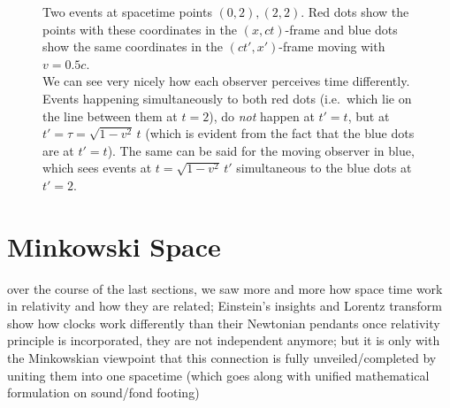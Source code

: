 \begin{figure}
\centering


\caption{Two events at spacetime points $(0,2), (2,2)$. Red dots show the points with these coordinates in the $(x, ct)$-frame and blue dots show the same coordinates in the $(ct', x')$-frame moving with $v = 0.5 c$.\\
We can see very nicely how each observer perceives time differently. Events happening simultaneously to both red dots (i.e.~which lie on the line between them at $t = 2$), do \emph{not} happen at $t' = t$, but at $t' = \tau = \sqrt{1 - v^2} \, t$ (which is evident from the fact that the blue dots are at $t' = t$). The same can be said for the moving observer in blue, which sees events at $t = \sqrt{1 - v^2} \, t'$ simultaneous to the blue dots at $t' = 2$.}
\end{figure}



\newpage



	\section{Minkowski Space}
over the course of the last sections, we saw more and more how space time work in relativity and how they are related; Einstein's insights and Lorentz transform show how clocks work differently than their Newtonian pendants once relativity principle is incorporated, they are not independent anymore; but it is only with the Minkowskian viewpoint that this connection is fully unveiled/completed by uniting them into one spacetime (which goes along with unified mathematical formulation on sound/fond footing)


